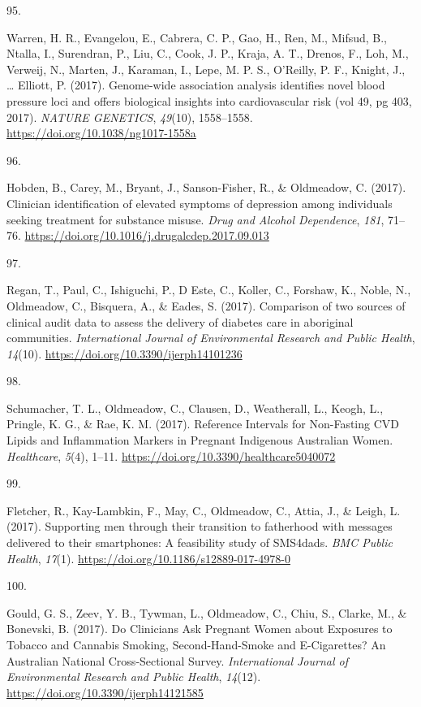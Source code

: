 \documentclass[11pt, a4paper]{awesome-cv}
\newlength{\csllabelwidth}
\newcommand{\CSLLeftMargin}[1]{\parbox[t]{\csllabelwidth}{#1}}
\newcommand{\CSLRightInline}[1]{\parbox[t]{\linewidth - \csllabelwidth}{#1}}
\begin{document}
\leavevmode\hypertarget{ref-warren_genome-wide_2017}{}%
\CSLLeftMargin{95. }
\CSLRightInline{Warren, H. R., Evangelou, E., Cabrera, C. P., Gao, H.,
Ren, M., Mifsud, B., Ntalla, I., Surendran, P., Liu, C., Cook, J. P.,
Kraja, A. T., Drenos, F., Loh, M., Verweij, N., Marten, J., Karaman, I.,
Lepe, M. P. S., O'Reilly, P. F., Knight, J., \ldots{} Elliott, P.
(2017). Genome-wide association analysis identifies novel blood pressure
loci and offers biological insights into cardiovascular risk (vol 49, pg
403, 2017). \emph{NATURE GENETICS}, \emph{49}(10), 1558--1558.
\url{https://doi.org/10.1038/ng1017-1558a}}

\leavevmode\hypertarget{ref-hobden_clinician_2017}{}%
\CSLLeftMargin{96. }
\CSLRightInline{Hobden, B., Carey, M., Bryant, J., Sanson-Fisher, R., \&
Oldmeadow, C. (2017). Clinician identification of elevated symptoms of
depression among individuals seeking treatment for substance misuse.
\emph{Drug and Alcohol Dependence}, \emph{181}, 71--76.
\url{https://doi.org/10.1016/j.drugalcdep.2017.09.013}}

\leavevmode\hypertarget{ref-regan_comparison_2017}{}%
\CSLLeftMargin{97. }
\CSLRightInline{Regan, T., Paul, C., Ishiguchi, P., D Este, C., Koller,
C., Forshaw, K., Noble, N., Oldmeadow, C., Bisquera, A., \& Eades, S.
(2017). Comparison of two sources of clinical audit data to assess the
delivery of diabetes care in aboriginal communities. \emph{International
Journal of Environmental Research and Public Health}, \emph{14}(10).
\url{https://doi.org/10.3390/ijerph14101236}}

\leavevmode\hypertarget{ref-schumacher_reference_2017}{}%
\CSLLeftMargin{98. }
\CSLRightInline{Schumacher, T. L., Oldmeadow, C., Clausen, D.,
Weatherall, L., Keogh, L., Pringle, K. G., \& Rae, K. M. (2017).
Reference Intervals for Non-Fasting CVD Lipids and Inflammation Markers
in Pregnant Indigenous Australian Women. \emph{Healthcare}, \emph{5}(4),
1--11. \url{https://doi.org/10.3390/healthcare5040072}}

\leavevmode\hypertarget{ref-fletcher_supporting_2017}{}%
\CSLLeftMargin{99. }
\CSLRightInline{Fletcher, R., Kay-Lambkin, F., May, C., Oldmeadow, C.,
Attia, J., \& Leigh, L. (2017). Supporting men through their transition
to fatherhood with messages delivered to their smartphones: A
feasibility study of SMS4dads. \emph{BMC Public Health}, \emph{17}(1).
\url{https://doi.org/10.1186/s12889-017-4978-0}}

\leavevmode\hypertarget{ref-gould_clinicians_2017}{}%
\CSLLeftMargin{100. }
\CSLRightInline{Gould, G. S., Zeev, Y. B., Tywman, L., Oldmeadow, C.,
Chiu, S., Clarke, M., \& Bonevski, B. (2017). Do Clinicians Ask Pregnant
Women about Exposures to Tobacco and Cannabis Smoking, Second-Hand-Smoke
and E-Cigarettes? An Australian National Cross-Sectional Survey.
\emph{International Journal of Environmental Research and Public
Health}, \emph{14}(12). \url{https://doi.org/10.3390/ijerph14121585}}
\end{document}
